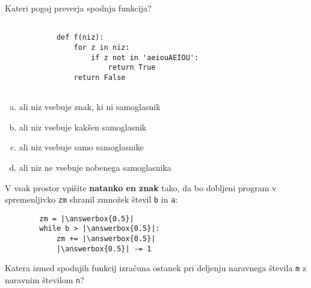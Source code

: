 \documentclass[arhiv, 10pt]{../izpit}
\newcommand{\inlinepy}[1]{\texttt{#1}}
\newcommand{\answerbox}[1]{\framebox{\vphantom{\large M}\hspace{#1cm}}}
\begin{document}
        \naloga*

        \begin{multicols}{2}
        \noindent
        Kateri pogoj preverja spodnja funkcija?
        \begin{verbatim}
        
            def f(niz):
                for z in niz:
                    if z not in 'aeiouAEIOU':
                        return True
                return False
            
        \end{verbatim}

        \begin{enumerate}[(a)]
\item ali niz vsebuje znak, ki ni samoglasnik
\item ali niz vsebuje kakšen samoglasnik
\item ali niz vsebuje samo samoglasnike
\item ali niz ne vsebuje nobenega samoglasnika
\end{enumerate}

        \end{multicols}
    
        \naloga*
        \begin{multicols}{2}
        \noindent
        V vsak prostor vpišite \textbf{natanko en znak} tako, da bo dobljeni program v spremenljivko \inlinepy{zm} shranil zmnožek števil \inlinepy{b} in \inlinepy{a}:
        
        \columnbreak
        \begin{verbatim}
        zm = |\answerbox{0.5}|
        while b > |\answerbox{0.5}|:
            zm += |\answerbox{0.5}|
            |\answerbox{0.5}| -= 1
        \end{verbatim}
        \end{multicols}
    
        \clearpage
        \naloga
        
        Katera izmed spodnjih funkcij izračuna ostanek pri deljenju naravnega števila \inlinepy{m} z naravnim številom \inlinepy{n}?
    
\end{document}
